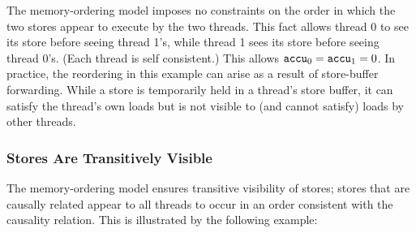 \begin{table}[!hbt]
\noindent{}
\caption{Intra-Processor Forwarding is Allowed \cite[Example 8-5]{ref:Intel}}
\label{tbl:litmus:intel:5}
\end{table}

\noindent
The memory-ordering model imposes no constraints on the order in which the two stores appear to execute by the two threads.
This fact allows thread 0 to see its store before seeing thread 1's, while thread 1 sees its store before seeing thread 0's.
(Each thread is self consistent.)
This allows $\texttt{accu}_0 = \texttt{accu}_1 = 0$.
\bigbreak
\noindent
In practice, the reordering in this example can arise as a result of store-buffer forwarding.
While a store is temporarily held in a thread's store buffer, it can satisfy the thread's own loads but is not visible to (and cannot satisfy) loads by other threads.

\newpage

\subsubsection*{Stores Are Transitively Visible}

The memory-ordering model ensures transitive visibility of stores; stores that are causally related appear to all threads to occur in an order consistent with the causality relation.
This is illustrated by the following example:

